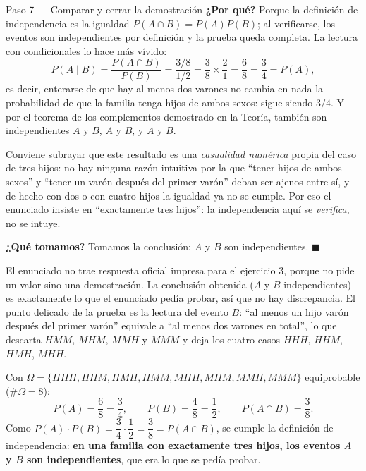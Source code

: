 \documentclass[11pt]{article}
\begin{document}
\begin{sol}
\begin{paso}{Paso 7 --- Comparar y cerrar la demostración}
\textbf{¿Por qué?} Porque la definición de independencia es la igualdad
$P(A\cap B)=P(A)P(B)$; al verificarse, los eventos son independientes por definición y la
prueba queda completa. La lectura con condicionales lo hace más vívido:
\[
P(A\mid B)=\frac{P(A\cap B)}{P(B)}=\frac{3/8}{1/2}=\frac{3}{8}\times\frac{2}{1}=\frac{6}{8}=\frac{3}{4}=P(A),
\]
es decir, enterarse de que hay al menos dos varones no cambia en nada la probabilidad de que
la familia tenga hijos de ambos sexos: sigue siendo $3/4$. Y por el teorema de los
complementos demostrado en la Teoría, también son independientes $\overline{A}$ y $B$, $A$ y
$\overline{B}$, y $\overline{A}$ y $\overline{B}$.

Conviene subrayar que este resultado es una \emph{casualidad numérica} propia del caso de
tres hijos: no hay ninguna razón intuitiva por la que ``tener hijos de ambos sexos'' y
``tener un varón después del primer varón'' deban ser ajenos entre sí, y de hecho con dos o
con cuatro hijos la igualdad ya no se cumple. Por eso el enunciado insiste en
``exactamente tres hijos'': la independencia aquí se \emph{verifica}, no se intuye.

\textbf{¿Qué tomamos?} Tomamos la conclusión: $A$ y $B$ son independientes. $\blacksquare$
\end{paso}
\end{sol}

\begin{nota}
El enunciado no trae respuesta oficial impresa para el ejercicio 3, porque no pide un valor
sino una demostración. La conclusión obtenida ($A$ y $B$ independientes) es exactamente lo
que el enunciado pedía probar, así que no hay discrepancia. El punto delicado de la prueba es
la lectura del evento $B$: ``al menos un hijo varón después del primer varón'' equivale a
``al menos dos varones en total'', lo que descarta $HMM$, $MHM$, $MMH$ y $MMM$ y deja los
cuatro casos $HHH$, $HHM$, $HMH$, $MHH$.
\end{nota}

\begin{resp}
Con $\Omega=\{HHH,HHM,HMH,HMM,MHH,MHM,MMH,MMM\}$ equiprobable ($\#\Omega=8$):
\[
P(A)=\frac{6}{8}=\frac{3}{4},\qquad
P(B)=\frac{4}{8}=\frac{1}{2},\qquad
P(A\cap B)=\frac{3}{8}.
\]
Como $P(A)\cdot P(B)=\dfrac{3}{4}\cdot\dfrac{1}{2}=\dfrac{3}{8}=P(A\cap B)$, se cumple la
definición de independencia: \textbf{en una familia con exactamente tres hijos, los eventos
$A$ y $B$ son independientes}, que era lo que se pedía probar.
\end{resp}
\end{document}
